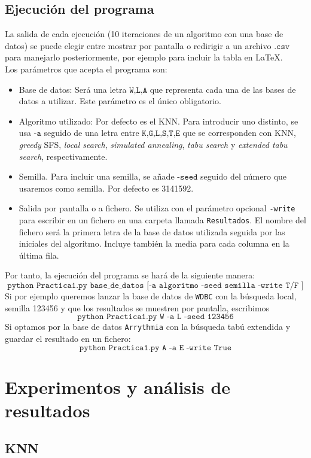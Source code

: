 \documentclass[11pt,leqno]{article}
\newcommand{\makeresume}[4]{
\pgfplotstablevertcat{#1}{#2}
\pgfplotstablecreatecol[copy column from table={#3}{in}]{inL} {#1}
\pgfplotstablecreatecol[copy column from table={#3}{out}]{outL} {#1}
\pgfplotstablecreatecol[copy column from table={#3}{red}]{redL} {#1}
\pgfplotstablecreatecol[copy column from table={#3}{T}]{tL} {#1}
\pgfplotstablecreatecol[copy column from table={#4}{in}]{inA} {#1}
\pgfplotstablecreatecol[copy column from table={#4}{out}]{outA} {#1}
\pgfplotstablecreatecol[copy column from table={#4}{red}]{redA} {#1}
\pgfplotstablecreatecol[copy column from table={#4}{T}]{tA} {#1}
}
\begin{document}
\subsection{Ejecución del programa}
La salida de cada ejecución (10 iteraciones de un algoritmo con una base de datos) se puede elegir entre mostrar por pantalla o redirigir a un archivo $\texttt{.csv}$ para manejarlo posteriormente, por ejemplo para incluir la tabla en \LaTeX.\\
Los parámetros que acepta el programa son:
\begin{itemize}
\item Base de datos: Será una letra $\texttt{W,L,A}$ que representa cada una de las bases de datos a utilizar. Este parámetro es el único obligatorio.
\item Algoritmo utilizado: Por defecto es el KNN. Para introducir uno distinto, se usa $\texttt{-a}$ seguido de una letra entre $\texttt{K,G,L,S,T,E}$ que se corresponden con KNN, \textit{greedy} SFS, \textit{local search}, \textit{simulated annealing}, \textit{tabu search} y \textit{extended tabu search}, respectivamente.
\item Semilla. Para incluir una semilla, se añade $\texttt{-seed}$ seguido del número que usaremos como semilla. Por defecto es 3141592.
\item Salida por pantalla o a fichero. Se utiliza con el parámetro opcional \texttt{-write} para escribir en un fichero en una carpeta llamada \texttt{Resultados}. El nombre del fichero será la primera letra de la base de datos utilizada seguida por las iniciales del algoritmo. Incluye también la media para cada columna en la última fila.
\end{itemize}
Por tanto, la ejecución del programa se hará de la siguiente manera:
\[ \texttt{python Practica1.py base\_de\_datos [-a algoritmo -seed semilla -write T/F ]} \]
Si por ejemplo queremos lanzar la base de datos de \texttt{WDBC} con la búsqueda local, semilla 123456 y que los resultados se muestren por pantalla, escribimos
\[ \texttt{python Practica1.py W -a L -seed 123456}\]
Si optamos por la base de datos \texttt{Arrythmia} con la búsqueda tabú extendida y guardar el resultado en un fichero:
\[ \texttt{python Practica1.py A -a E -write True}\]

\section{Experimentos y análisis de resultados}

\subsection{KNN}
\makeresume{\dataKNN}{\datawKNN}{\datalKNN}{\dataaKNN}
\end{document}
